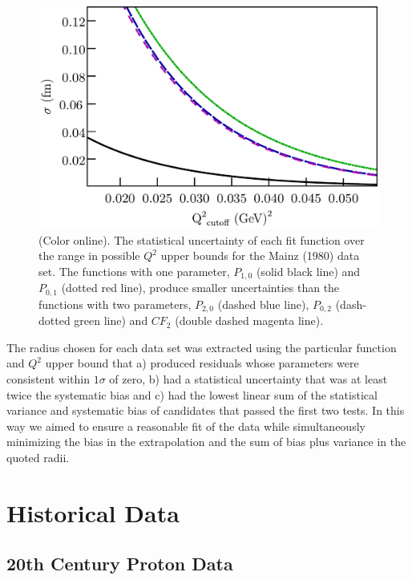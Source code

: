 \documentclass[aps,prd,twocolumn,groupedaddress,10pt]{revtex4-1}
\begin{document}
\begin{figure}[h]
	\includegraphics[scale=0.385]{uncertainty_exmample}
	\caption{(Color online). The statistical uncertainty of each fit function over the range in possible $Q^2$ upper bounds for the Mainz (1980) data set. The functions with one parameter, $P_{1,0}$ (solid black line) and $P_{0,1}$ (dotted red line), produce smaller uncertainties than the functions with two parameters, $P_{2,0}$ (dashed blue line), $P_{0,2}$ (dash-dotted green line) and ${CF}_2$ (double dashed magenta line).}
	\label{uncertainty}
\end{figure}

The radius chosen for each data set was extracted using the particular function and $Q^2$ upper bound that a) produced residuals whose parameters were consistent within $1\sigma$ of zero, b) had a statistical uncertainty that was at least twice the systematic bias and c) had the lowest linear sum of the statistical variance and systematic bias of candidates that passed the first two tests. In this way we aimed to ensure a reasonable fit of the data while simultaneously minimizing the bias in the extrapolation and the sum of bias plus variance in the quoted radii.

\section{Historical Data}
\subsection{20th Century Proton Data}
\end{document}
